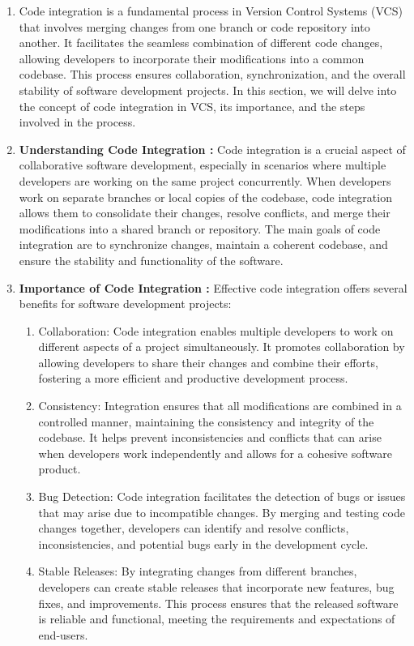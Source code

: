 \begin{enumerate}
    \item Code integration is a fundamental process in Version Control Systems (VCS) that involves merging changes from one branch or code repository into another. It facilitates the seamless combination of different code changes, allowing developers to incorporate their modifications into a common codebase. This process ensures collaboration, synchronization, and the overall stability of software development projects. In this section, we will delve into the concept of code integration in VCS, its importance, and the steps involved in the process.
    \item \textbf{Understanding Code Integration : }Code integration is a crucial aspect of collaborative software development, especially in scenarios where multiple developers are working on the same project concurrently. When developers work on separate branches or local copies of the codebase, code integration allows them to consolidate their changes, resolve conflicts, and merge their modifications into a shared branch or repository. The main goals of code integration are to synchronize changes, maintain a coherent codebase, and ensure the stability and functionality of the software.
    \item \textbf{Importance of Code Integration : } Effective code integration offers several benefits for software development projects:
    \begin{enumerate}
        \item Collaboration: Code integration enables multiple developers to work on different aspects of a project simultaneously. It promotes collaboration by allowing developers to share their changes and combine their efforts, fostering a more efficient and productive development process.
        \item Consistency: Integration ensures that all modifications are combined in a controlled manner, maintaining the consistency and integrity of the codebase. It helps prevent inconsistencies and conflicts that can arise when developers work independently and allows for a cohesive software product.
        \item Bug Detection: Code integration facilitates the detection of bugs or issues that may arise due to incompatible changes. By merging and testing code changes together, developers can identify and resolve conflicts, inconsistencies, and potential bugs early in the development cycle.
        \item Stable Releases: By integrating changes from different branches, developers can create stable releases that incorporate new features, bug fixes, and improvements. This process ensures that the released software is reliable and functional, meeting the requirements and expectations of end-users.

\end{enumerate}
\end{enumerate}

